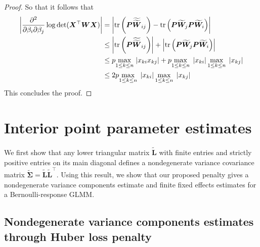 \documentclass[11pt, a4paper]{article}
\newcommand*{\bb}{\boldsymbol}
\theoremstyle{example} \newtheorem{example}{Example}[section]
\theoremstyle{theorem} \newtheorem{theorem}{Theorem}[section]
\theoremstyle{theorem }\newtheorem{proposition}{Proposition}[section]
\theoremstyle{theorem }\newtheorem{corollary}{Corollary}[section]
\def\det{{\mathop{\rm det}}}
\def\\bbeta{\bb{\\bbeta}}
\def\bSigma{\bb{\Sigma}}
\def\bL{\bb{L}}
\def\bLt{\tilde{\bb{L}}}
\begin{document}
\begin{proof}
So that it follows that 
\begin{equation}
\begin{aligned}
\left|\frac{\partial^2}{\partial \beta_i \partial \beta_j} \log\det (\bb X^\top\bb W \bb X) \right|& =\left| \textrm{tr}\left(\bb P\widetilde{\widetilde{\bb W}}_{ij} \right) - \textrm{tr}\left(\bb P\widetilde{\bb W}_j \bb P\widetilde{\bb W}_i \right) \right|\\ 
&\leq \left| \textrm{tr}\left(\bb P\widetilde{\widetilde{\bb W}}_{ij} \right) \right| + \left| \textrm{tr}\left(\bb P\widetilde{\bb W}_j \bb P\widetilde{\bb W}_i \right) \right|\\ 
&\leq p\underset{1\leq k\leq n}{\max} \; |x_{ki}x_{kj}| + p\underset{1\leq k \leq n}{\max} \; \left|x_{ki}\right| \underset{1\leq k \leq n}{\max} \; \left|x_{kj}\right| \\ 
&\leq 2p\underset{1\leq k \leq n}{\max} \; \left|x_{ki}\right| \underset{1\leq k \leq n}{\max} \; \left|x_{kj}\right| \\ 
\end{aligned}
\end{equation}
This concludes the proof. 
\end{proof}	

\section{Interior point parameter estimates}
\label{sec:mv_vc}

We first show that any lower triangular matrix $\tilde{\bL}$ with finite entries and strictly positive entries on its main diagonal defines a nondegenerate variance covariance matrix $\tilde{\bSigma} = \bLt \bLt^\top$. Using this result, we show that our proposed penalty gives a nondegenerate variance components estimate and finite fixed effects estimates for a Bernoulli-response GLMM.  

\subsection{Nondegenerate variance components estimates through Huber loss penalty}
\end{document}
